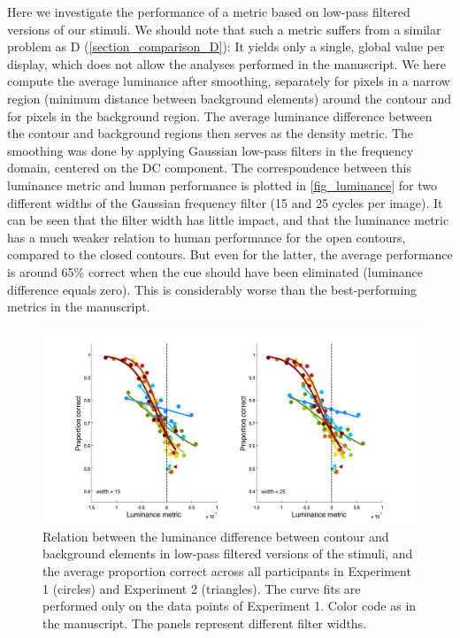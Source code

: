 \documentclass[12pt]{article}
\begin{document}
Here we investigate the performance of a metric based on low-pass filtered versions of our stimuli. We should note that such a metric suffers from a similar problem as D (\autoref{section_comparison_D}): It yields only a single, global value per display, which does not allow the analyses performed in the manuscript. We here compute the average luminance after smoothing, separately for pixels in a narrow region (minimum distance between background elements) around the contour and for pixels in the background region. The average luminance difference between the contour and background regions then serves as the density metric. The smoothing was done by applying Gaussian low-pass filters in the frequency domain, centered on the DC component. The correspondence between this luminance metric and human performance is plotted in \autoref{fig_luminance} for two different widths of the Gaussian frequency filter (15 and 25 cycles per image). It can be seen that the filter width has little impact, and that the luminance metric has a much weaker relation to human performance for the open contours, compared to the closed contours. But even for the latter, the average performance is around 65\% correct when the cue should have been eliminated (luminance difference equals zero). This is considerably worse than the best-performing metrics in the manuscript.\\

\begin{figure}
\includegraphics{Figures/FIG_SUP_luminance.png}
\caption{Relation between the luminance difference between contour and background elements in low-pass filtered versions of the stimuli, and the average proportion correct across all participants in Experiment 1 (circles) and Experiment 2 (triangles). The curve fits are performed only on the data points of Experiment 1. Color code as in the manuscript. The panels represent different filter widths.}
\label{fig_luminance}
\end{figure}




{}



\end{document}
